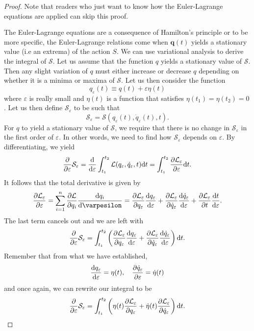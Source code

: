\documentclass[11pt]{scrartcl}
\renewcommand\vec{\mathbf}
\begin{document}
\begin{proof}
\label{proof:1}
Note that readers who just want to know how the Euler-Lagrange equations are applied can skip this proof. 

The Euler-Lagrange equations are a consequence of Hamilton's principle or to be more specific, the Euler-Lagrange relations come when $\vec{q}(t)$ yields a stationary value (i.e an extrema) of the action $S$. We can use variational analysis to derive the integral of $\mathcal{S}$. Let us assume that the function $q$ yields a stationary value of $\mathcal{S}$. Then any slight variation of $q$ must either increase or decrease $q$ depending on whether it is a minima or maxima of $\mathcal{S}$. Let us then consider the function 
\[q_{\varepsilon} (t) \equiv q(t) + \varepsilon \eta (t)\]
where $\varepsilon$ is really small and $\eta (t)$ is a function that satisfies $\eta (t_1) = \eta(t_2) = 0$. Let us then define $\mathcal{S}_{\varepsilon}$ to be such that 
\[\mathcal{S}_{\varepsilon} = \mathcal{S} (q_{\varepsilon} (t), \dot{q}_{\varepsilon} (t), t).\]
For $q$ to yield a stationary value of $\mathcal{S}$, we require that there is no change in $\mathcal{S}_{\varepsilon}$ in the first order of $\varepsilon$. In other words, we need to find how $\mathcal{S}_{\varepsilon}$ depends on $\varepsilon$. By differentiating, we yield 
\[\pdv{}{\varepsilon} \mathcal{S}_{\varepsilon} = \dv{}{\varepsilon} \int_{t_1}^{t_2} \mathcal{L} (q_{\varepsilon}, \dot{q}_{\varepsilon}, t) \dd t = \int_{t_1}^{t_2} \pdv{\mathcal{L}_{\varepsilon}}{\varepsilon}\dd t.\]
It follows that the total derivative is given by 
\[\pdv{\mathcal{L}_{\varepsilon}}{\varepsilon} = \sum_{i=1}^{n}\pdv{\mathcal{L}}{q_i}\dv{q_i}{\varpesilon} = \pdv{\mathcal{L}_{\varepsilon}}{q_{\varepsilon}}\dv{q_{\varepsilon}}{\varepsilon} + \pdv{\mathcal{L}_{\varepsilon}}{\dot{q}_{\varepsilon}}\dv{\dot{q}_{\varepsilon}}{\varepsilon} + \pdv{\mathcal{L}_{\varepsilon}}{t}\dv{t}{\varepsilon}.\]
The last term cancels out and we are left with 
\[\pdv{}{\varepsilon}\mathcal{S}_{\varepsilon} = \int_{t_1}^{t_2}\left(\pdv{\mathcal{L}_{\varepsilon}}{q_{\varepsilon}}\dv{q_{\varepsilon}}{\varepsilon} + \pdv{\mathcal{L}_{\varepsilon}}{\dot{q}_{\varepsilon}}\dv{\dot{q}_{\varepsilon}}{\varepsilon}\right)\dd t.\]
Remember that from what we have established, 
\[\dv{q_{\varepsilon}}{\varepsilon} = \eta (t), \quad \pdv{\dot{q}_{\varepsilon}}{\varepsilon} = \dot{\eta} (t)\]
and once again, we can rewrite our integral to be 
\[\pdv{}{\varepsilon}\mathcal{S}_{\varepsilon} = \int_{t_1}^{t_2} \left(\eta (t)\pdv{\mathcal{L}_{\varepsilon}}{q_{\varepsilon}} + \dot\eta (t) \pdv{\mathcal{L}_{\varepsilon}}{\dot{q}_{\varepsilon}}\right)\dd t.\]

\end{proof}
\end{document}
